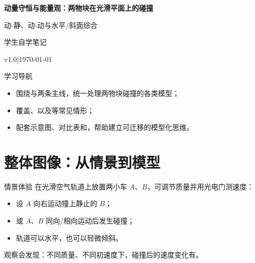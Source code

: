 \documentclass[a4paper,11pt]{ctexart}
\renewcommand{\notetitle}{动量守恒与能量观：两物块在光滑平面上的碰撞}
\renewcommand{\notesubtitle}{动-静、动-动与水平/斜面综合}
\renewcommand{\noteauthor}{学生自学笔记}
\renewcommand{\noteversion}{v1.0}
\renewcommand{\notedate}{\today}
\begin{document}
\MathNoteEnablePrint

\thispagestyle{empty}
\setcounter{page}{1}

\noindent
\begin{minipage}[t][0.7\textheight][c]{\textwidth}
  \raggedleft
  \vspace*{\fill}
  {\sffamily\bfseries\Huge\color{accent}\notetitle\par}
  \vspace{0.6em}
  {\Large\color{inkgray}\notesubtitle\par}
  \vspace{0.5em}
  {\large\color{inkgray}\noteauthor\par}
  \vspace{0.4em}
  {\normalsize\color{inkgray}\noteversion\quad|\quad\notedate\par}
  \vspace*{\fill}
\end{minipage}

\begin{center}
\begin{minipage}{0.84\textwidth}
  \textcolor{inkgray}{\sffamily\small 学习导航}\\
  \begin{itemize}
    \item 围绕与两条主线，统一处理两物块碰撞的各类模型；
    \item 覆盖、以及等常见情形；
    \item 配套示意图、对比表和，帮助建立可迁移的模型化思维。
  \end{itemize}
\end{minipage}
\end{center}
\vspace{1em}

\clearpage
\thispagestyle{plain}
\tableofcontents
\newpage

\section{整体图像：从情景到模型}

\begin{examplebox}{情景体验}
在光滑空气轨道上放置两小车 $A$、$B$，可调节质量并用光电门测速度：\par
\begin{itemize}
  \item 设 $A$ 向右运动撞上静止的 $B$；
  \item 或 $A$、$B$ 同向/相向运动后发生碰撞；
  \item 轨道可以水平，也可以轻微倾斜。
\end{itemize}
观察会发现：不同质量、不同初速度下，碰撞后的速度变化有。
\end{examplebox}
\end{document}
